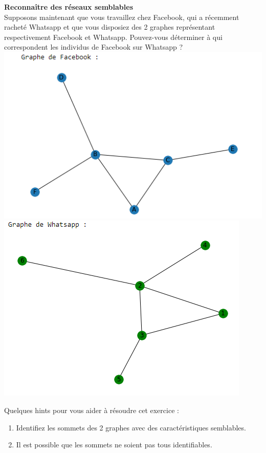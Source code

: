 \begin{Exercice}[5 minutes] \textbf{Reconnaître des réseaux semblables}\\
    Supposons maintenant que vous travaillez chez Facebook, qui a récemment racheté Whatsapp et que vous disposiez des 2 graphes représentant respectivement Facebook et Whatsapp. Pouvez-vous déterminer à qui correspondent les individus de Facebook sur Whatsapp ?\\
    
    \includegraphics[]{Network2.PNG}\\
    \includegraphics[]{Network3.PNG}
    
    
    \begin{conseil}
    Quelques hints pour vous aider à résoudre cet exercice :
    \begin{enumerate}
        \item Identifiez les sommets des 2 graphes avec des caractéristiques semblables.
        \item Il est possible que les sommets ne soient pas tous identifiables.
    \end{enumerate}
        

\end{conseil}
\end{Exercice}
